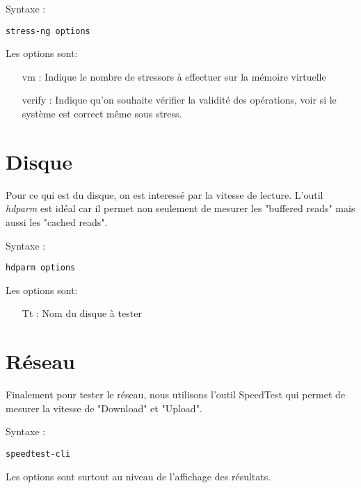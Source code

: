 Syntaxe : 
\begin{verbatim}
stress-ng options
\end{verbatim}
Les options sont: 
\begin{itemize}
  \item [vm] : Indique le nombre de stressors à effectuer sur la mémoire virtuelle
  \item [verify] : Indique qu'on souhaite vérifier la validité des opérations, voir si le système est correct même sous stress. \newline
\end{itemize}

\section{Disque}

Pour ce qui est du disque, on est interessé par la vitesse de lecture. L'outil \textit{hdparm} est idéal car il permet non seulement de mesurer les "buffered reads" mais aussi les "cached reads". \newline

Syntaxe : 
\begin{verbatim}
hdparm options
\end{verbatim}
Les options sont: 
\begin{itemize}
  \item [Tt] : Nom du disque à tester \newline
\end{itemize}


\section{Réseau}

Finalement pour tester le réseau, nous utilisons l'outil SpeedTest qui permet de mesurer la vitesse de "Download" et "Upload". \newline

Syntaxe : 
\begin{verbatim}
speedtest-cli
\end{verbatim}

Les options sont surtout au niveau de l'affichage des résultats.